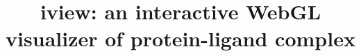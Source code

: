 \documentclass[twocolumn]{bmcart}%
\begin{document}
\begin{frontmatter}

\begin{fmbox}


\title{iview: an interactive WebGL visualizer of protein-ligand complex}


\author[
   addressref={aff1},                   %
   corref={aff1},                       %
   email={jackyleehongjian@gmail.com}   %
]{ }
\author[
   addressref={aff1},                   %
]{ }
\author[
   addressref={aff2},
   email={nakane.t@gmail.com}
]{ }
\author[
   addressref={aff1},                   %
]{ }


\address[id=aff1]{%
  , %
  ,                              %
}
\address[id=aff2]{%
  ,
  ,
}


\end{fmbox}
\end{frontmatter}
\end{document}
